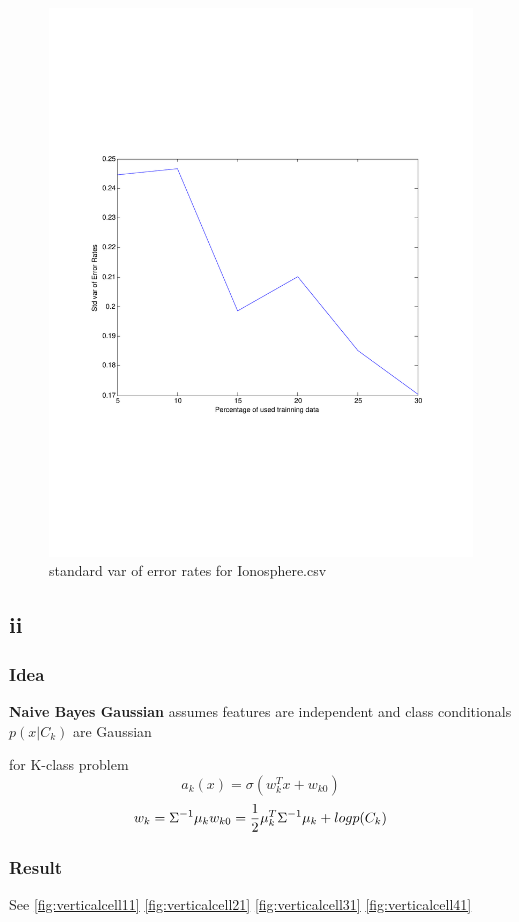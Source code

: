 \documentclass[12pt]{amsart}
\begin{document}
\begin{figure}[H]
\centering
        \includegraphics[totalheight=18cm]{Iono_std_logReg.pdf}
    \caption{standard var of error rates for Ionosphere.csv}
    \label{fig:verticalcell4}
\end{figure}
\subsection*{ii}
\subsubsection*{Idea}
\textbf{Naive Bayes Gaussian} assumes features are independent and
class conditionals $p(x|C_k)$ are Gaussian

for K-class problem
$$
	a_k(x) = \sigma(w_k^Tx + w_{k0})
$$
$$
	w_k = \Sigma^{-1}\mu_k\\
	w_{k0} = \frac{1}{2}\mu_k^T \Sigma^{-1}\mu_k + log p(C_k)
$$

\subsubsection*{Result}
See
\ref{fig:verticalcell11}
\ref{fig:verticalcell21}
\ref{fig:verticalcell31}
\ref{fig:verticalcell41}
\end{document}
